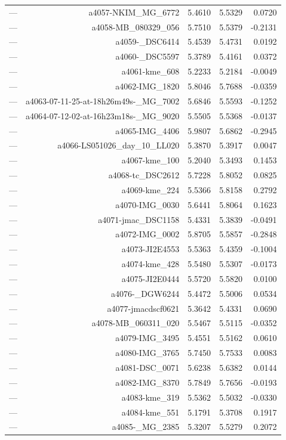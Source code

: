 \begin{table}[htbp]
\begin{tabular}{lrrrr}
— & a4057-NKIM_MG_6772 & 5.4610 & 5.5329 & 0.0720 \\
— & a4058-MB_080329_056 & 5.7510 & 5.5379 & -0.2131 \\
— & a4059-_DSC6414 & 5.4539 & 5.4731 & 0.0192 \\
— & a4060-_DSC5597 & 5.3789 & 5.4161 & 0.0372 \\
— & a4061-kme_608 & 5.2233 & 5.2184 & -0.0049 \\
— & a4062-IMG_1820 & 5.8046 & 5.7688 & -0.0359 \\
— & a4063-07-11-25-at-18h26m49s-_MG_7002 & 5.6846 & 5.5593 & -0.1252 \\
— & a4064-07-12-02-at-16h23m18s-_MG_9020 & 5.5505 & 5.5368 & -0.0137 \\
— & a4065-IMG_4406 & 5.9807 & 5.6862 & -0.2945 \\
— & a4066-LS051026_day_10_LL020 & 5.3870 & 5.3917 & 0.0047 \\
— & a4067-kme_100 & 5.2040 & 5.3493 & 0.1453 \\
— & a4068-tc_DSC2612 & 5.7228 & 5.8052 & 0.0825 \\
— & a4069-kme_224 & 5.5366 & 5.8158 & 0.2792 \\
— & a4070-IMG_0030 & 5.6441 & 5.8064 & 0.1623 \\
— & a4071-jmac_DSC1158 & 5.4331 & 5.3839 & -0.0491 \\
— & a4072-IMG_0002 & 5.8705 & 5.5857 & -0.2848 \\
— & a4073-JI2E4553 & 5.5363 & 5.4359 & -0.1004 \\
— & a4074-kme_428 & 5.5480 & 5.5307 & -0.0173 \\
— & a4075-JI2E0444 & 5.5720 & 5.5820 & 0.0100 \\
— & a4076-_DGW6244 & 5.4472 & 5.5006 & 0.0534 \\
— & a4077-jmacdscf0621 & 5.3642 & 5.4331 & 0.0690 \\
— & a4078-MB_060311_020 & 5.5467 & 5.5115 & -0.0352 \\
— & a4079-IMG_3495 & 5.4551 & 5.5162 & 0.0610 \\
— & a4080-IMG_3765 & 5.7450 & 5.7533 & 0.0083 \\
— & a4081-DSC_0071 & 5.6238 & 5.6382 & 0.0144 \\
— & a4082-IMG_8370 & 5.7849 & 5.7656 & -0.0193 \\
— & a4083-kme_319 & 5.5362 & 5.5032 & -0.0330 \\
— & a4084-kme_551 & 5.1791 & 5.3708 & 0.1917 \\
— & a4085-_MG_2385 & 5.3207 & 5.5279 & 0.2072 \\

\end{tabular}
\end{table}
